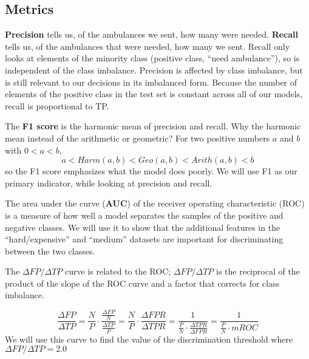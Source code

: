 

\subsection{Metrics}\label{Methods_Metrics}

{\bf Precision} tells us, of the ambulances we sent, how many were needed.  {\bf Recall} tells us, of the ambulances that were needed, how many we sent.  Recall only looks at elements of the minority class (positive class, ``need ambulance''), so is independent of the class imbalance.  Precision is affected by class imbalance, but is still relevant to our decisions in its imbalanced form.  Because the number of elements of the positive class in the test set is constant across all of our models, recall is proportional to TP. 

The {\bf F1 score} is the harmonic mean of precision and recall. Why the harmonic mean instead of the arithmetic or geometric?  For two positive numbers $a$ and $b$ with $0 < a < b$, 
$$a < Harm(a,b) < Geo(a,b) < Arith(a,b) < b$$
so the F1 score emphasizes what the model does poorly.  We will use F1 as our primary indicator, while looking at precision and recall.  

The area under the curve ({\bf AUC}) of the receiver operating characteristic (ROC) is a measure of how well a model separates the samples of the positive and negative classes.  We will use it to show that the additional features in the ``hard/expensive'' and ``medium'' datasets are important for discriminating between the two classes.  

The $\Delta FP/\Delta TP$ curve is related to the ROC; $\Delta FP/\Delta TP$ is the reciprocal of the product of the slope of the ROC curve and a factor that corrects for class imbalance. 


$$
\frac{\Delta FP}{\Delta TP} = 
\frac{N}{P} \cdot \frac{\frac{\Delta FP}{N}}{\frac{\Delta TP}{P}}
= \frac{N}{P} \cdot \frac{\Delta FPR}{\Delta TPR}
= \frac{1}{\frac{P}{N} \cdot \frac{\Delta TPR}{\Delta FPR}}
= \frac{1}{\frac{P}{N} \cdot mROC}
$$
 We will use this curve to find the value of the discrimination threshold where $\Delta FP/\Delta TP = 2.0$




